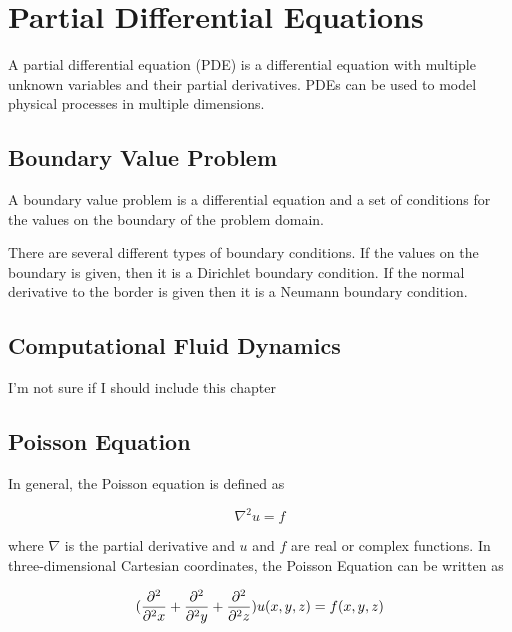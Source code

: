 \section*{Partial Differential Equations}

A partial differential equation (PDE) is a differential equation with multiple 
unknown variables and their partial derivatives. PDEs can be used to model physical 
processes in multiple dimensions. 

\subsection*{Boundary Value Problem}

A boundary value problem is a differential equation and a set of conditions for the values on the boundary of the problem domain. 

There are several different types of boundary conditions. If the values on the boundary is given, then it is a Dirichlet boundary condition. If the normal derivative to the border is given then it is a Neumann boundary condition\cite{Kreyszig}.

\subsection*{Computational Fluid Dynamics}

I'm not sure if I should include this chapter

\subsection*{Poisson Equation}

In general, the Poisson equation is defined as 

$$\nabla^2 u = f$$

where $\nabla$ is the partial derivative and $u$ and $f$ are real or complex 
functions. In three-dimensional Cartesian coordinates, the Poisson Equation can 
be written as 

$$(\frac{\partial^2}{\partial^2 x} + \frac{\partial^2}{\partial^2 y} + \frac{\partial^2}{\partial^2 z}) u (x, y, z) = f(x, y, z)$$


